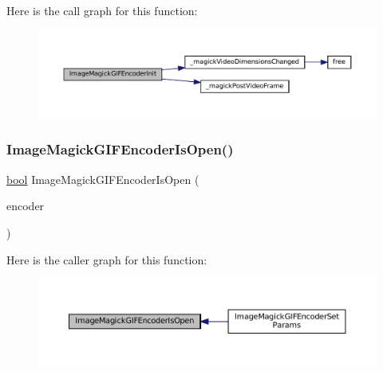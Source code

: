 Here is the call graph for this function\+:
\nopagebreak
\begin{figure}[H]
\begin{center}
\leavevmode
\includegraphics[width=350pt]{imagemagick-gif-encoder_8c_a09cc198e1bf6838fe97da63133398315_cgraph}
\end{center}
\end{figure}
\mbox{\label{imagemagick-gif-encoder_8c_a05aba14b683c69c288b19fb794847dfc}} 
\subsubsection{\texorpdfstring{Image\+Magick\+G\+I\+F\+Encoder\+Is\+Open()}{ImageMagickGIFEncoderIsOpen()}}
{\footnotesize\ttfamily \mbox{\hyperlink{libretro_8h_a4a26dcae73fb7e1528214a068aca317e}{bool}} Image\+Magick\+G\+I\+F\+Encoder\+Is\+Open (\begin{DoxyParamCaption}\item[{struct \mbox{\hyperlink{imagemagick-gif-encoder_8h_struct_image_magick_g_i_f_encoder}{Image\+Magick\+G\+I\+F\+Encoder}} $\ast$}]{encoder }\end{DoxyParamCaption})}

Here is the caller graph for this function\+:
\nopagebreak
\begin{figure}[H]
\begin{center}
\leavevmode
\includegraphics[width=350pt]{imagemagick-gif-encoder_8c_a05aba14b683c69c288b19fb794847dfc_icgraph}
\end{center}
\end{figure}
\mbox{\label{imagemagick-gif-encoder_8c_ad1c19071d722aa4826774e1f179b3f57}} 
